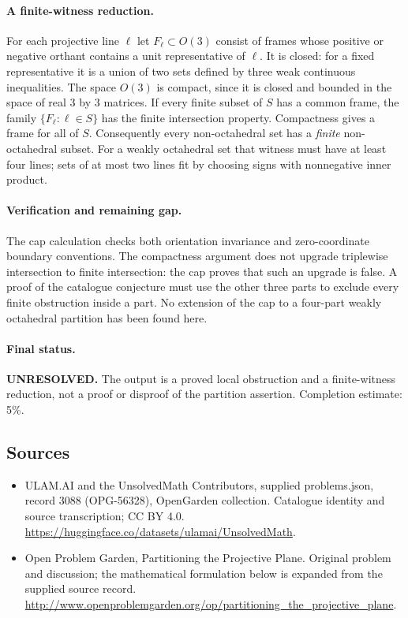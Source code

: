 \documentclass[11pt,a4paper]{article}
\begin{document}
\paragraph{A finite-witness reduction.}
For each projective line $\ell$ let $F_\ell\subset O(3)$ consist of frames
whose positive or negative orthant contains a unit representative of $\ell$.
It is closed: for a fixed representative it is a union of two sets defined
by three weak continuous inequalities. The space $O(3)$ is compact, since
it is closed and bounded in the space of real $3$ by $3$ matrices.
If every finite subset of $S$ has a common frame, the family
$\{F_\ell:\ell\in S\}$ has the finite intersection property. Compactness
gives a frame for all of $S$. Consequently every non-octahedral set has a
\emph{finite} non-octahedral subset. For a weakly octahedral set that witness
must have at least four lines; sets of at most two lines fit by choosing
signs with nonnegative inner product.

\paragraph{Verification and remaining gap.}
The cap calculation checks both orientation invariance and zero-coordinate
boundary conventions. The compactness argument does not upgrade triplewise
intersection to finite intersection: the cap proves that such an upgrade is
false. A proof of the catalogue conjecture must use the other three parts to
exclude every finite obstruction inside a part. No extension of the cap to
a four-part weakly octahedral partition has been found here.

\paragraph{Final status.}
\textbf{UNRESOLVED.} The output is a proved local obstruction and a finite-witness
reduction, not a proof or disproof of the partition assertion. Completion
estimate: 5\%.

\subsection{Sources}
\begin{itemize}
\item[S1] ULAM.AI and the UnsolvedMath Contributors, supplied problems.json, record 3088 (OPG-56328), OpenGarden collection. Catalogue identity and source transcription; CC BY 4.0.
\url{https://huggingface.co/datasets/ulamai/UnsolvedMath}.
\item[S2] Open Problem Garden, Partitioning the Projective Plane. Original problem and discussion; the mathematical formulation below is expanded from the supplied source record.
\url{http://www.openproblemgarden.org/op/partitioning_the_projective_plane}.

\end{itemize}
\end{document}
